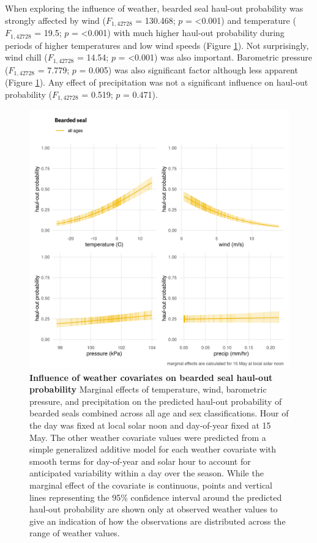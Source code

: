 \documentclass[fleqn,10pt,lineno]{wlpeerj} %
\begin{document}
When exploring the influence of weather, bearded seal haul-out probability
was strongly affected by wind
(\(F_{1,42728}\)
= 130.468; \(p\) = \textless0.001)
and temperature
(\(F_{1,42728}\)
= 19.5; \(p\) =
\textless0.001) with much higher haul-out probability during
periods of higher temperatures and low wind speeds (Figure \ref{fig:beardedHOwx}).
Not surprisingly, wind chill
(\(F_{1,42728}\)
= 14.54; \(p\) =
\textless0.001) was also important. Barometric
pressure (\(F_{1,42728}\)
= 7.779; \(p\) =
0.005) was also significant factor although less
apparent (Figure \ref{fig:beardedHOwx}). Any effect of precipitation
was not a significant influence on haul-out probability
(\(F_{1,42728}\)
= 0.519; \(p\) =
0.471).



\begin{figure}
\includegraphics[width=1\linewidth]{../figures/beardedHOwx-1} \caption{\textbf{Influence of weather covariates on bearded seal haul-out probability} \linebreak Marginal effects of temperature, wind, barometric pressure, and precipitation on the predicted haul-out probability of bearded seals combined across all age and sex classifications. Hour of the day was fixed at local solar noon and day-of-year fixed at 15 May. The other weather covariate values were predicted from a simple generalized additive model for each weather covariate with smooth terms for day-of-year and solar hour to account for anticipated variability within a day over the season. While the marginal effect of the covariate is continuous, points and vertical lines representing the 95\% confidence interval around the predicted haul-out probability are shown only at observed weather values to give an indication of how the observations are distributed across the range of weather values.}\label{fig:beardedHOwx}
\end{figure}
\end{document}
